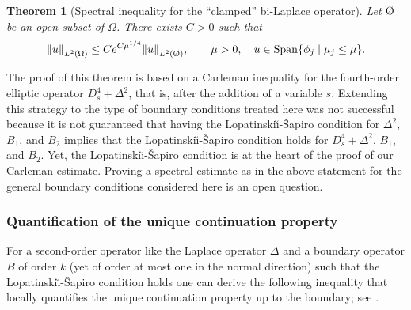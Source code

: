 \documentclass[10pt]{amsart}
\let\oldO\O
\renewcommand{\O}{\textup{\oldO}}
\let\sep\mid
\theoremstyle{plain}
\newtheorem{theorem}{Theorem}[section]
\theoremstyle{definition}
\newcommand{\LS}{Lopatinski\u{\i}-\v{S}apiro\xspace}
\newcommand{\Norm}[2]{{\| #1 \|}_{#2}}
\DeclareMathOperator{\Span}{Span}
\begin{document}
\begin{theorem}[Spectral inequality for the ``clamped'' bi-Laplace
operator]
\label{theorem: spectral inequality}
Let $\O$ be an open subset of $\Omega$.
There exists $C>0$ such that
\begin{equation*}
\Norm{u}{L^2(\Omega)} \leq C e^{C \mu^{1/4}}
\Norm{u}{L^2(\O)}, \qquad \mu >0, \quad u \in \Span \{\phi_j\sep \mu_j \leq \mu\}.
\end{equation*}
\end{theorem}
The proof of this theorem is based on a Carleman inequality for the
fourth-order elliptic operator $D_s^4 + \Delta^2$, that is, after the
addition of a variable $s$. Extending this strategy to the type of
boundary conditions treated here was not successful because it is not
guaranteed that having the \LS condition for $\Delta^2$, $B_1$, and
$B_2$ implies that the \LS condition holds for $D_s^4 +\Delta^2$, $B_1$, and
$B_2$. Yet, the \LS condition is at the heart of the proof of our
Carleman estimate. Proving a spectral estimate as in the above
statement for the general boundary conditions considered here is
an open question.

\subsubsection{Quantification of the unique continuation property}

For a second-order operator like the Laplace operator $\Delta$ and a
boundary operator $B$ of order $k$ (yet of order at most one in the
normal direction) such that the \LS condition holds one can derive the
following inequality that locally quantifies the unique continuation property
up to the boundary; see \cite[Lem.\,9.2]{JGL-vol1}.
\end{document}
